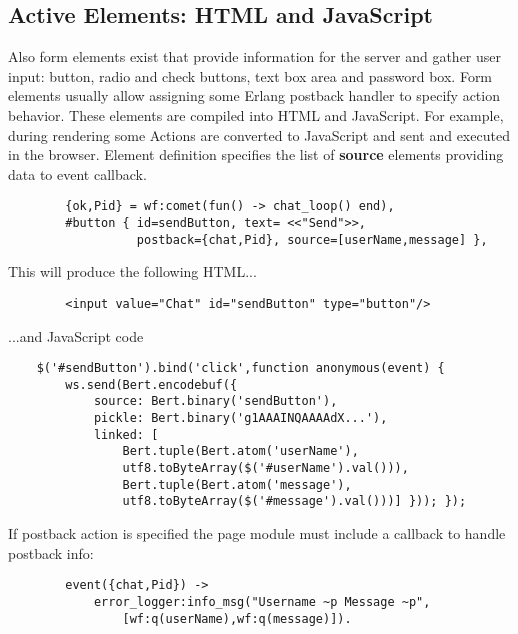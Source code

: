 \subsection{Active Elements: HTML and JavaScript}
Also form elements exist that provide information for the server
and gather user input: button, radio and check buttons, text box area and password box.
Form elements usually allow assigning some Erlang postback handler to specify action behavior.
These elements are compiled into HTML and JavaScript. For example, during rendering some
Actions are converted to JavaScript and sent and executed in the browser.
Element definition specifies the list of {\bf source} elements providing data to event callback.

\vspace{1\baselineskip}
\begin{lstlisting}
        {ok,Pid} = wf:comet(fun() -> chat_loop() end),
        #button { id=sendButton, text= <<"Send">>, 
                  postback={chat,Pid}, source=[userName,message] },
\end{lstlisting}
\vspace{1\baselineskip}

This will produce the following HTML...

\vspace{1\baselineskip}
\begin{lstlisting}
        <input value="Chat" id="sendButton" type="button"/>
\end{lstlisting}
\vspace{1\baselineskip}

...and JavaScript code

\vspace{1\baselineskip}
\begin{lstlisting}
    $('#sendButton').bind('click',function anonymous(event) { 
        ws.send(Bert.encodebuf({
            source: Bert.binary('sendButton'), 
            pickle: Bert.binary('g1AAAINQAAAAdX...'),
            linked: [
                Bert.tuple(Bert.atom('userName'),
                utf8.toByteArray($('#userName').val())),
                Bert.tuple(Bert.atom('message'),
                utf8.toByteArray($('#message').val()))] })); });
\end{lstlisting}
\vspace{1\baselineskip}

If postback action is specified the page module must include a callback to handle postback info:

\vspace{1\baselineskip}
\begin{lstlisting}
        event({chat,Pid}) ->
            error_logger:info_msg("Username ~p Message ~p",
                [wf:q(userName),wf:q(message)]).
\end{lstlisting}
\vspace{1\baselineskip}

